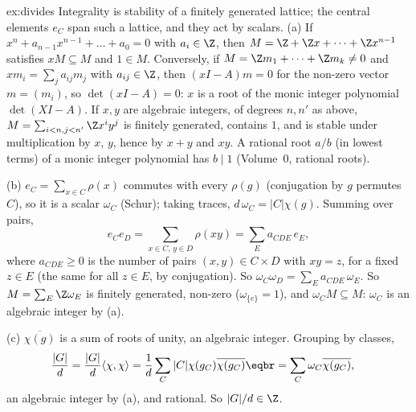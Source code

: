 \begin{solution}{ex:divides}
\idea Integrality is stability of a finitely generated lattice; the central elements $e_C$ span such a lattice, and they act by scalars.
\writeup (a) If $x^n+a_{n-1}x^{n-1}+\dots+a_0=0$ with $a_i\in\Z$, then $M=\Z+\Z x+\dots+\Z x^{n-1}$ satisfies $xM\subseteq M$ and $1\in M$. Conversely, if $M=\Z m_1+\dots+\Z m_k\ne0$ and $xm_i=\sum_ja_{ij}m_j$ with $a_{ij}\in\Z$, then $(xI-A)m=0$ for the non-zero vector $m=(m_i)$, so $\det(xI-A)=0$: $x$ is a root of the monic integer polynomial $\det(XI-A)$. If $x,y$ are algebraic integers, of degrees $n,n'$ as above, $M=\sum_{i<n,j<n'}\Z x^iy^j$ is finitely generated, contains $1$, and is stable under multiplication by $x$, $y$, hence by $x+y$ and $xy$. A rational root $a/b$ (in lowest terms) of a monic integer polynomial has $b\mid1$ (Volume~0, rational roots).

(b) $e_C=\sum_{x\in C}\rho(x)$ commutes with every $\rho(g)$ (conjugation by $g$ permutes $C$), so it is a scalar $\omega_C$ (Schur); taking traces, $d\,\omega_C=|C|\chi(g)$. Summing over pairs,
\[
e_Ce_D=\sum_{x\in C,\,y\in D}\rho(xy)=\sum_Ea_{CDE}\,e_E,
\]
where $a_{CDE}\ge0$ is the number of pairs $(x,y)\in C\times D$ with $xy=z$, for a fixed $z\in E$ (the same for all $z\in E$, by conjugation). So $\omega_C\omega_D=\sum_Ea_{CDE}\,\omega_E$. So $M=\sum_E\Z\omega_E$ is finitely generated, non-zero ($\omega_{\{e\}}=1$), and $\omega_CM\subseteq M$: $\omega_C$ is an algebraic integer by (a).

(c) $\overline{\chi(g)}$ is a sum of roots of unity, an algebraic integer. Grouping by classes,
\[
\begin{aligned}\frac{|G|}d=\frac{|G|}d\langle\chi,\chi\rangle&=\frac1d\sum_C|C|\chi(g_C)\overline{\chi(g_C)}\eqbr=\sum_C\omega_C\overline{\chi(g_C)},\end{aligned}
\]
an algebraic integer by (a), and rational. So $|G|/d\in\Z$.
\end{solution}

